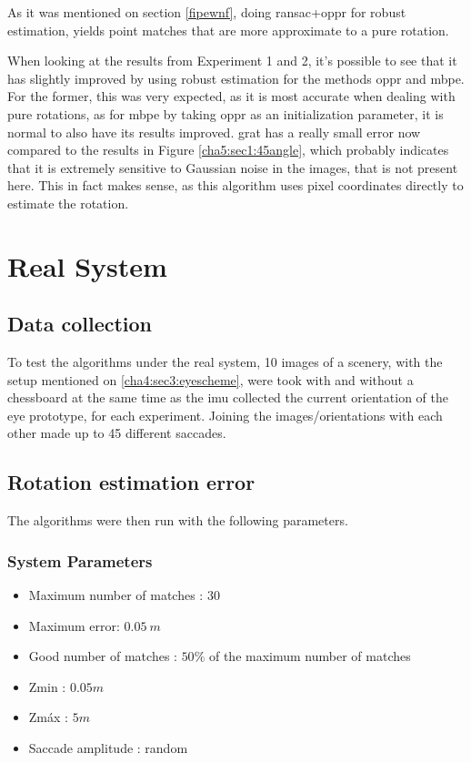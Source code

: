 As it was mentioned on section \ref{fipewnf}, doing \acrshort{ransac}+\acrshort{oppr} for robust estimation, yields point matches that are more approximate to a pure rotation.

When looking at the results from Experiment 1 and 2, it's possible to see that it has slightly improved by using robust estimation for the methods \acrshort{oppr} and \acrshort{mbpe}. For the former, this was very expected, as it is most accurate when dealing with pure rotations, as for \acrshort{mbpe} by taking \acrshort{oppr} as an initialization parameter, it is normal to also have its results improved. \acrshort{grat} has a really small error now compared to the results in Figure \ref{cha5:sec1:45angle}, which probably indicates that it is extremely sensitive to Gaussian noise in the images, that is not present here. This in fact makes sense, as this algorithm uses pixel coordinates directly to estimate the rotation.

\section{Real System}
\subsection{Data collection}
To test the algorithms under the real system, 10 images of a scenery, with the setup mentioned on \ref{cha4:sec3:eyescheme}, were took with and without a chessboard at the same time as the \acrshort{imu} collected the current orientation of the eye prototype, for each experiment. Joining the images/orientations with each other made up to 45 different saccades. 
\subsection{Rotation estimation error}
\label{fefwefesxs}
The algorithms were then run with the following parameters.
\subsubsection{System Parameters}
\begin{itemize}
	\item Maximum number of matches : $30$
	\item Maximum error: $0.05 \ m$
	\item Good number of matches : $50 \%$ of the maximum number of matches
	\item Zmin : $0.05 m$
	\item Zmáx : $5 m$
	\item Saccade amplitude : random
\end{itemize}

